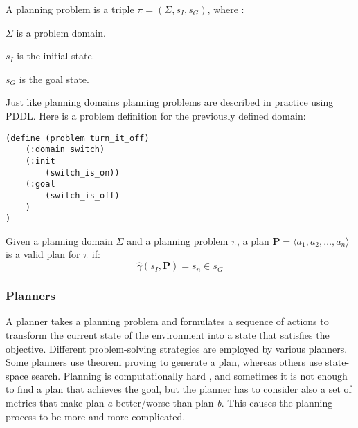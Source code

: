 \begin{Tdef}
    A planning problem is a triple $\pi = (\Sigma,s_I,s_G)$, where :
    \vspace{-0.5em}
    \begin{compactitem}
        \item 
        $\Sigma$ is a problem domain.
        
        \item 
        $s_I$ is the initial state.
        
        \item 
        $s_G$ is the goal state.
    \end{compactitem}
    \vspace{-0.5em}
\end{Tdef}
\vspace{-0.5em}
Just like planning domains planning problems are described in practice using PDDL. 
Here is a problem definition for the previously defined domain:
\vspace{0.5em}
\lstset{
  xleftmargin=.2\textwidth, 
  xrightmargin=.2\textwidth,
  frame=single,
  framexleftmargin=1.5em, 
  framextopmargin=1.5em,
  framexbottommargin=1.5em,
}
\begin{lstlisting}[language=PDDL, caption=Problem definition example]
(define (problem turn_it_off)
    (:domain switch)
    (:init
        (switch_is_on))
    (:goal
        (switch_is_off)
    )
)
\end{lstlisting}

\begin{Tdef}
    Given a planning domain $\Sigma$ and a planning problem $\pi$,
    a plan $\mathbf{P} = \langle a_1,a_2,\dots,a_n\rangle$ is a valid plan for $\pi$ if:
    $$\hat{\gamma}(s_I,\mathbf{P}) = s_n \in s_G$$
\end{Tdef}

\subsubsection{Planners}

A planner takes a planning problem and formulates a sequence of actions 
to transform the current state of the environment into a state 
that satisfies the objective. Different problem-solving 
strategies are employed by various planners. 
Some planners use theorem proving \cite{PlanningSatisfiabilitykautz1992} 
to generate a plan, whereas others use state-space search. 
Planning is computationally hard 
\cite{ComplexityDecidabilityUndecidabilityerol1995}, and 
sometimes it is not enough to find a plan that achieves the goal, 
but the planner has to consider also a set of metrics that make plan 
\textit{a} better/worse than plan \textit{b}. 
This causes the planning process to be more and more complicated.

